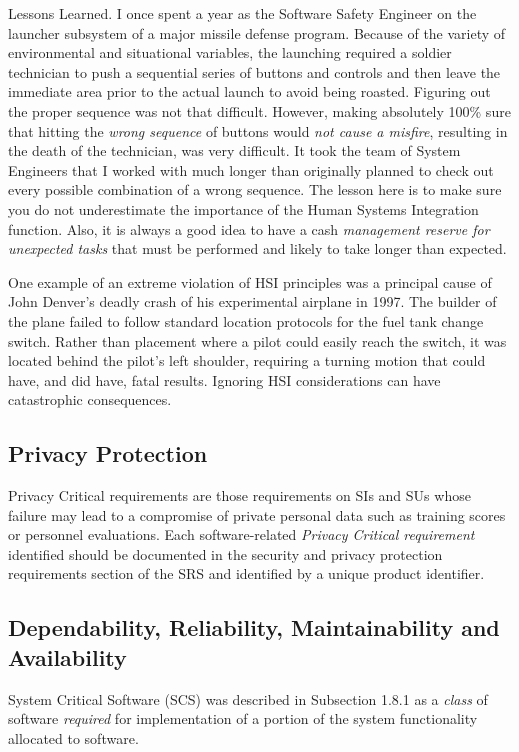 Lessons Learned. I once spent a year as the
Software Safety Engineer on the launcher subsystem of a major missile defense program.
Because of the variety of environmental and situational variables, the launching required a soldier
technician to push a sequential series of buttons
and controls and then leave the immediate area
prior to the actual launch to avoid being roasted.
Figuring out the proper sequence was not that
difficult. However, making absolutely 100\% sure that hitting the \textit{wrong sequence} of buttons would
\textit{not cause a misfire}, resulting in the death of the
technician, was very difficult. It took the team
of System Engineers that I worked with much
longer than originally planned to check out every
possible combination of a wrong sequence. The
lesson here is to make sure you do not underestimate the importance of the Human Systems
Integration function. Also, it is always a good
idea to have a cash \textit{management reserve for unexpected tasks} that must be performed and likely to
take longer than expected.

One example of an extreme violation of HSI principles
was a principal cause of John Denver’s deadly crash of his
experimental airplane in 1997. The builder of the plane
failed to follow standard location protocols for the fuel tank
change switch. Rather than placement where a pilot could
easily reach the switch, it was located behind the pilot’s left
shoulder, requiring a turning motion that could have, and
did have, fatal results. Ignoring HSI considerations can have
catastrophic consequences.

\subsection{Privacy Protection}

Privacy Critical requirements are those requirements on SIs
and SUs whose failure may lead to a compromise of private
personal data such as training scores or personnel evaluations. Each software-related \textit{Privacy Critical requirement}
identified should be documented in the security and privacy
protection requirements section of the SRS and identified by
a unique product identifier.

\subsection{Dependability, Reliability, Maintainability and Availability}
System Critical Software (SCS) was described in Subsection
1.8.1 as a \textit{class} of software \textit{required} for implementation of a
portion of the system functionality allocated to software.

